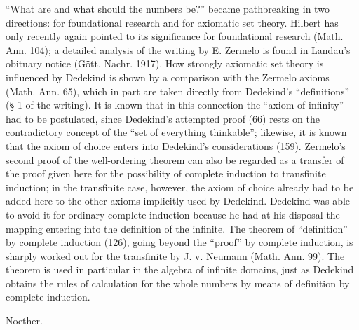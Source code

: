\documentclass[11pt]{article}
\begin{document}
\noindent ``What are and what should the numbers be?'' became pathbreaking in two directions: for foundational research and for axiomatic set theory. Hilbert has only recently again pointed to its significance for foundational research (Math. Ann. 104); a detailed analysis of the writing by E. Zermelo is found in Landau's obituary notice (Gött. Nachr. 1917). How strongly axiomatic set theory is influenced by Dedekind is shown by a comparison with the Zermelo axioms (Math. Ann. 65), which in part are taken directly from Dedekind's ``definitions'' (§ 1 of the writing). It is known that in this connection the ``axiom of infinity'' had to be postulated, since Dedekind's attempted proof (66) rests on the contradictory concept of the ``set of everything thinkable''; likewise, it is known that the axiom of choice enters into Dedekind's considerations (159). Zermelo's second proof of the well-ordering theorem can also be regarded as a transfer of the proof given here for the possibility of complete induction to transfinite induction; in the transfinite case, however, the axiom of choice already had to be added here to the other axioms implicitly used by Dedekind. Dedekind was able to avoid it for ordinary complete induction because he had at his disposal the mapping entering into the definition of the infinite. The theorem of ``definition'' by complete induction (126), going beyond the ``proof'' by complete induction, is sharply worked out for the transfinite by J. v. Neumann (Math. Ann. 99). The theorem is used in particular in the algebra of infinite domains, just as Dedekind obtains the rules of calculation for the whole numbers by means of definition by complete induction.

\begin{flushright}Noether.\end{flushright}
\end{document}
